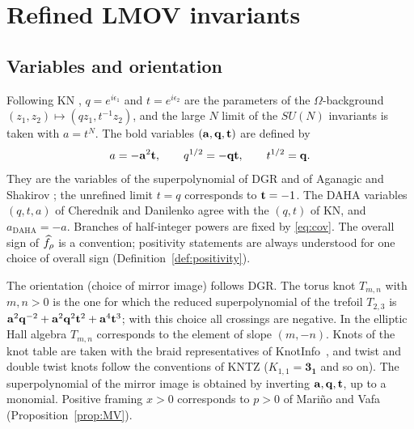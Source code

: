 \section{Refined LMOV invariants}\label{sec:prelim}

\subsection{Variables and orientation}
Following KN \cite{Kameyama17}, $q=e^{i\epsilon_1}$ and $t=e^{i\epsilon_2}$ are the parameters of the $\Omega$-background $(z_1,z_2)\mapsto(qz_1,t^{-1}z_2)$,
and the large $N$ limit of the $SU(N)$ invariants is taken with $a=t^N$.
The bold variables $(\mathbf{a},\mathbf{q},\mathbf{t})$ are defined by
\begin{equation}\label{eq:cov}
a=-\mathbf{a}^2\mathbf{t},\qquad q^{1/2}=-\mathbf{q}\mathbf{t},\qquad t^{1/2}=\mathbf{q} .
\end{equation}
They are the variables of the superpolynomial of DGR \cite{Dunfield05} and of Aganagic and Shakirov \cite{Aganagic11}; the unrefined limit $t=q$ corresponds to $\mathbf{t}=-1$.
The DAHA variables $(q,t,a)$ of Cherednik and Danilenko \cite{Cherednik14} agree with the $(q,t)$ of KN, and $a_{\mathrm{DAHA}}=-a$.
Branches of half-integer powers are fixed by \eqref{eq:cov}.
The overall sign of $\widehat{f}_\rho$ is a convention; positivity statements are always understood for one choice of overall sign (Definition~\ref{def:positivity}).

The orientation (choice of mirror image) follows DGR.
The torus knot $T_{m,n}$ with $m,n>0$ is the one for which the reduced superpolynomial of the trefoil $T_{2,3}$ is $\mathbf{a}^2\mathbf{q}^{-2}+\mathbf{a}^2\mathbf{q}^2\mathbf{t}^2+\mathbf{a}^4\mathbf{t}^3$; with this choice all crossings are negative.
In the elliptic Hall algebra $T_{m,n}$ corresponds to the element of slope $(m,-n)$.
Knots of the knot table are taken with the braid representatives of KnotInfo~\cite{KnotInfo}, and twist and double twist knots follow the conventions of KNTZ \cite{Kameyama19} ($K_{1,1}=\mathbf{3_1}$ and so on).
The superpolynomial of the mirror image is obtained by inverting $\mathbf{a},\mathbf{q},\mathbf{t}$, up to a monomial.
Positive framing $x>0$ corresponds to $p>0$ of Mari\~no and Vafa (Proposition~\ref{prop:MV}).

